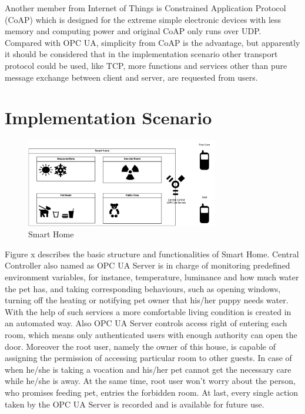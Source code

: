\documentclass[]{llncs}
\begin{document}
Another member from Internet of Things is Constrained Application Protocol  (CoAP) which is designed for the extreme simple electronic devices with less memory and computing power and original CoAP only runs over UDP. Compared with OPC UA, simplicity from CoAP is the advantage, but apparently it should be considered that in the implementation scenario other transport protocol could be used, like TCP, more functions and services other than pure message exchange between client and server, are requested from users.

\section{Implementation Scenario}
 \begin{figure}[!htbp]
	\centering
	\includegraphics[width=0.75\textwidth]{SmartHome}
		\caption[ ]{Smart Home}
	\label{fig:SmartHome}
\end{figure}
Figure x describes the basic structure and functionalities of Smart Home. Central Controller also named as OPC UA Server is in charge of monitoring predefined environment variables, for instance, temperature, luminance and how much water the pet has, and taking corresponding behaviours, such as opening windows, turning off the heating or notifying pet owner that his/her puppy needs water. With the help of such services a more comfortable living condition is created in an automated way. Also OPC UA Server controls access right of entering each room, which means only authenticated users with enough authority can open the door. Moreover the root user, namely the owner of this house, is capable of assigning the permission of accessing particular room to other guests. In case of when he/she is taking a vocation and his/her pet cannot get the necessary care while he/she is away. At the same time, root user won’t worry about the person, who promises feeding pet, entries the forbidden room. At last, every single action taken by the OPC UA Server is recorded and is available for future use. 
\end{document}
